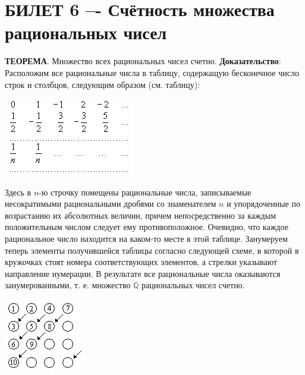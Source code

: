 \documentclass{article}
\newcommand{\Q}{\mathbb Q}
\begin{document}
\section{БИЛЕТ 6 –- Счётность множества рациональных чисел}
\textbf{ТЕОРЕМА}. Множество всех рациональных чисел счетно. 
\newline
\newline
\textbf{Доказательство}:
Расположим все рациональные числа в таблицу, содержащую бесконечное число строк и столбцов, следующим образом (см. таблицу):
    \newline
    \begin{center}
    \includegraphics[scale=1.5]{4.jpg}
    \end{center}
     Здесь в $n$-ю строчку помещены рациональные числа, записываемые несократимыми рациональными дробями со знаменателем $n$ и упорядоченные по возрастанию их абсолютных величин, причем непосредственно за каждым положительным числом следует ему противоположное. Очевидно, что каждое рациональное число находится на каком-то месте в этой таблице.
     \newline
     \newline
     Занумеруем теперь элементы получившейся таблицы согласно следующей схеме, в которой в кружочках стоят номера соответствующих элементов, а стрелки указывают направление нумерации. В результате все рациональные числа оказываются занумерованными, т. е. множество $\Q$ рациональных чисел счетно.
     \newline
     \begin{center}
     \includegraphics[scale=1.5]{6.jpg}
     \end{center}
\newpage
\end{document}
